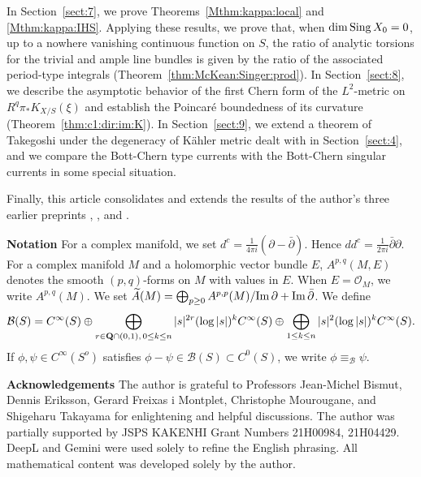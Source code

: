 \documentclass[amscd, leqno]{amsart}
\theoremstyle{plain}
\theoremstyle{definition}
\theoremstyle{remark}
\begin{document}
In Section~\ref{sect:7}, we prove Theorems~\ref{Mthm:kappa:local} and \ref{Mthm:kappa:IHS}.
Applying these results, we prove that, when $\dim {\rm Sing}\,X_{0}=0$, up to a nowhere vanishing continuous function on $S$, 
the ratio of analytic torsions for the trivial and ample line bundles is given by 
the ratio of the associated period-type integrals (Theorem~\ref{thm:McKean:Singer:prod}).
In Section~\ref{sect:8}, we describe the asymptotic behavior of the first Chern form of 
the $L^{2}$-metric on $R^{q}\pi_{*}K_{X/S}(\xi)$ and establish the Poincar\'e boundedness of its curvature (Theorem~\ref{thm:c1:dir:im:K}).
In Section~\ref{sect:9}, we extend a theorem of Takegoshi \cite{Takegoshi95} under the degeneracy of K\"ahler metric
dealt with in Section~\ref{sect:4}, and we compare the Bott-Chern type currents with the Bott-Chern singular currents \cite{BGS90b}
in some special situation. 
\par
Finally, this article consolidates and extends the results of the author's three earlier preprints \cite{Yoshikawa10a}, \cite{Yoshikawa10b}, 
and \cite[Appendix A]{Imaike24}.


\medskip
\par{\bf Notation }
For a complex manifold, we set $d^{c}=\frac{1}{4\pi i}(\partial-\bar{\partial})$. Hence $dd^{c}=\frac{1}{2\pi i}\bar{\partial}\partial$.
For a complex manifold $M$ and a holomorphic vector bundle $E$, $A^{p,q}(M,E)$ denotes the smooth $(p,q)$-forms on $M$
with values in $E$. When $E={\mathcal O}_{M}$, we write $A^{p,q}(M)$.
We set $\widetilde{A}(M)=\bigoplus_{p\geq0}A^{p,p}(M)/{\rm Im}\,\partial+{\rm Im}\,\bar{\partial}$. We define
$$
{\mathcal B}(S) = C^{\infty}(S) \oplus \bigoplus_{r\in{\bf Q}\cap(0,1),\, 0 \leq k \leq n} |s|^{2r}(\log|s|)^{k}C^{\infty}(S) \oplus
\bigoplus_{1\leq k \leq n} |s|^{2}(\log|s|)^{k}C^{\infty}(S).
$$
If $\phi,\psi\in C^{\infty}(S^{o})$ satisfies $\phi-\psi\in{\mathcal B}(S)\subset C^{0}(S)$, we write $\phi\equiv_{\mathcal B}\psi$.

\medskip
\par
{\bf Acknowledgements }
The author is grateful to Professors Jean-Michel Bismut, Dennis Eriksson, Gerard Freixas i Montplet, Christophe Mourougane, 
and Shigeharu Takayama for enlightening and helpful discussions. 
The author was partially supported by JSPS KAKENHI Grant Numbers 21H00984, 21H04429.
DeepL and Gemini were used solely to refine the English phrasing. All mathematical content was developed solely by the author.
\end{document}
